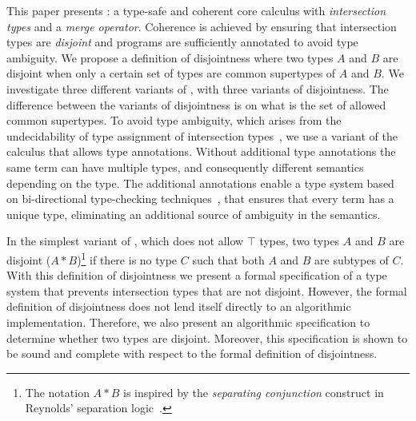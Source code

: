 This paper presents \name: a type-safe and coherent core calculus with
\emph{intersection types} and a \emph{merge operator}. Coherence is
achieved by ensuring that intersection types are \emph{disjoint} and
programs are sufficiently annotated to avoid type
ambiguity.  We propose a definition of disjointness where two types
$A$ and $B$ are disjoint when only a certain set of types are common
supertypes of $A$ and $B$. We investigate three different variants of
\name, with three variants of disjointness. The difference between the 
variants of disjointness is on what is the set of allowed
common supertypes. To avoid type ambiguity, which arises from the
undecidability of type assignment of intersection
types~\cite{vanBakel92}, we use a variant of the calculus that allows type
annotations. Without additional type annotations the same term can have
multiple types, and consequently different semantics depending on the
type. The additional annotations enable a type system based on 
bi-directional type-checking techniques~\cite{Pierce00local,Dunfield04tri}, that ensures that 
every term has a unique type, eliminating an additional source of ambiguity in
the semantics.

In the simplest variant of \name, which does not allow $\top$ types,
two types $A$ and $B$ are disjoint ($A * B$)\footnote{The notation $A
  * B$ is inspired by the \emph{separating conjunction} construct in
  Reynolds' separation logic~\cite{reynolds2002separation}.} if there
is no type $C$ such that both $A$ and $B$ are subtypes of
$C$. 
With this definition of disjointness we present a formal specification
of a type system that prevents intersection types that are not
disjoint. However, the formal definition of disjointness does not lend
itself directly to an algorithmic implementation.  Therefore, we also
present an algorithmic specification to determine whether two types
are disjoint. Moreover, this specification is shown to be sound and
complete with respect to the formal definition of disjointness.

